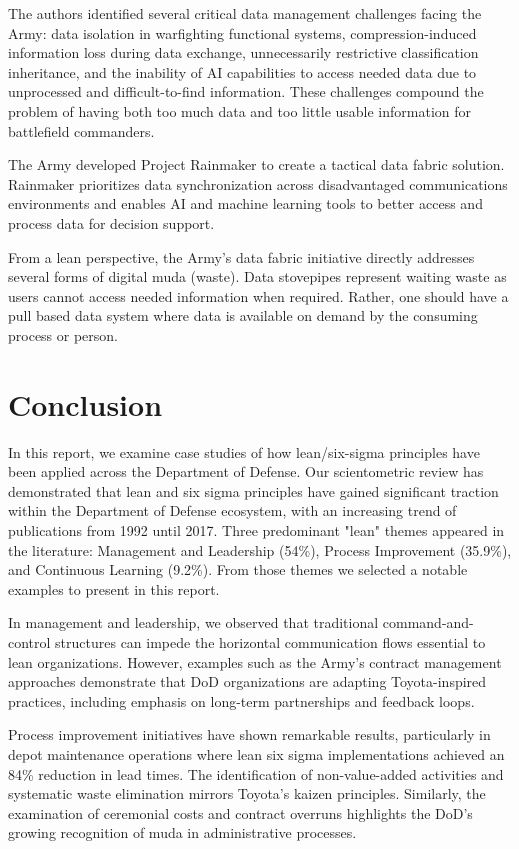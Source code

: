 \documentclass{article}
\begin{document}
		The authors identified several critical data management challenges facing the Army: data isolation in warfighting functional systems, compression-induced information loss during data exchange, unnecessarily restrictive classification inheritance, and the inability of AI capabilities to access needed data due to unprocessed and difficult-to-find information.
		These challenges compound the problem of having both too much data and too little usable information for battlefield commanders.

		The Army developed Project Rainmaker to create a tactical data fabric solution.
		Rainmaker prioritizes data synchronization across disadvantaged communications environments and enables AI and machine learning tools to better access and process data for decision support.

		From a lean perspective, the Army's data fabric initiative directly addresses several forms of digital muda (waste).
		Data stovepipes represent waiting waste as users cannot access needed information when required.
		Rather, one should have a pull based data system where data is available on demand by the consuming process or person.

	\section{Conclusion}

	In this report, we examine case studies of how lean/six-sigma principles have been applied across the Department of Defense.
	Our scientometric review has demonstrated that lean and six sigma principles have gained significant traction within the Department of Defense ecosystem, with an increasing trend of publications from 1992 until 2017. 
	Three predominant "lean" themes appeared in the literature: Management and Leadership (54\%), Process Improvement (35.9\%), and Continuous Learning (9.2\%). 
	From those themes we selected a notable examples to present in this report.

	In management and leadership, we observed that traditional command-and-control structures can impede the horizontal communication flows essential to lean organizations.
	However, examples such as the Army's contract management approaches demonstrate that DoD organizations are adapting Toyota-inspired practices, including emphasis on long-term partnerships and feedback loops.

	Process improvement initiatives have shown remarkable results, particularly in depot maintenance operations where lean six sigma implementations achieved an 84\% reduction in lead times. 
	The identification of non-value-added activities and systematic waste elimination mirrors Toyota's kaizen principles. 
	Similarly, the examination of ceremonial costs and contract overruns highlights the DoD's growing recognition of muda in administrative processes.
\end{document}
